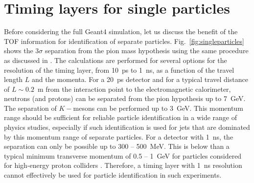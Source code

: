 \section{Timing layers for single particles}

Before considering the full Geant4 simulation, let us discuss the benefit of the TOF information
for identification of separate particles. Fig.~\ref{fig:singleparticles} shows the $3\sigma$ separation from the pion
mass hypothesis using the same procedure as discussed  in \cite{Cerri:2018rkm}. The 
calculations are performed for several options for the resolution of the timing layer, from 10~ps to 1~ns,
as a function of the travel length $L$ and the momenta. For a 20~ps detector and  for a typical travel 
distance of $L\sim 0.2$~m from the interaction point to the 
electromagnetic calorimeter, neutrons (and protons) can be separated from the pion hypothesis up to 7~GeV. The separation of $K-$mesons can be performed up to 3~GeV.
This momentum range should be sufficient for reliable particle identification in a wide range 
of physics studies, especially if such identification is used for jets that are dominated
by this momentum range of separate particles.
For a detector  with 1~ns, the separation can only be possible  up to  300 -- 500~MeV. This is below  than a typical
minimum transverse momentum of 0.5 -- 1~GeV for particles considered for high-energy proton colliders .
Therefore, a timing layer with 1~ns resolution cannot effectively be used for particle identification in such experiments.

